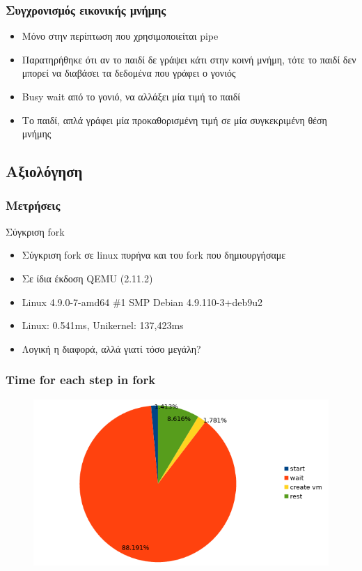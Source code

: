 \documentclass[red,slidestop,notes,compress,mathserif]{beamer}
\begin{document}
\begin{frame}
\frametitle{Συγχρονισμός εικονικής μνήμης}
\begin{itemize}
\item Μόνο στην περίπτωση που χρησιμοποιείται pipe
\item Παρατηρήθηκε ότι αν το παιδί δε γράψει κάτι στην κοινή μνήμη, τότε το παιδί δεν μπορεί να διαβάσει τα δεδομένα που γράφει ο γονιός
\item Busy wait από το γονιό, να αλλάξει μία τιμή το παιδί
\item Το παιδί, απλά γράφει μία προκαθορισμένη τιμή σε μία συγκεκριμένη θέση μνήμης
\end{itemize}
\end{frame}

\subsection{Αξιολόγηση}
\begin{frame}
\frametitle{Μετρήσεις}
\begin{block}{Σύγκριση fork}
\begin{itemize}
\item Σύγκριση fork σε linux πυρήνα και του fork που δημιουργήσαμε
\item Σε ίδια έκδοση QEMU (2.11.2)
\item Linux 4.9.0-7-amd64 \#1 SMP Debian 4.9.110-3+deb9u2
\item Linux: 0.541ms, Unikernel: 137,423ms
\item Λογική η διαφορά, αλλά γιατί τόσο μεγάλη?
\end{itemize}
\end{block}
\end{frame}

\begin{frame}
\frametitle{Time for each step in fork}
\begin{figure}
\center
\includegraphics[scale=0.8]{figures/fork_pie.png}
\end{figure}
\end{frame}
\end{document}
